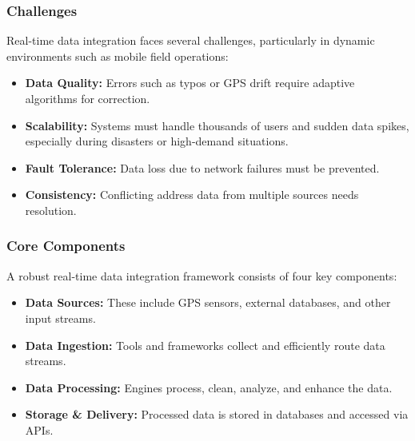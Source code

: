         \subsubsection{Challenges}
        Real-time data integration faces several challenges, particularly in dynamic environments such as mobile field operations: \autocite{vexdata2024Jun}
        
        \begin{itemize}
            \item \textbf{Data Quality:} Errors such as typos or GPS drift require adaptive algorithms for correction.
        
            \item \textbf{Scalability:} Systems must handle thousands of users and sudden data spikes, especially during disasters or high-demand situations.
        
            \item \textbf{Fault Tolerance:} Data loss due to network failures must be prevented.
        
            \item \textbf{Consistency:} Conflicting address data from multiple sources needs resolution.
        \end{itemize}
                
        \subsubsection{Core Components}

        A robust real-time data integration framework consists of four key components: \autocite{Limited2025Mar}

    \begin{itemize}
        \item \textbf{Data Sources:} These include GPS sensors, external databases, and other input streams.  

        \item \textbf{Data Ingestion:} Tools and frameworks collect and efficiently route data streams.  

        \item \textbf{Data Processing:} Engines process, clean, analyze, and enhance the data.  

        \item \textbf{Storage \& Delivery:} Processed data is stored in databases and accessed via APIs.

    \end{itemize}

